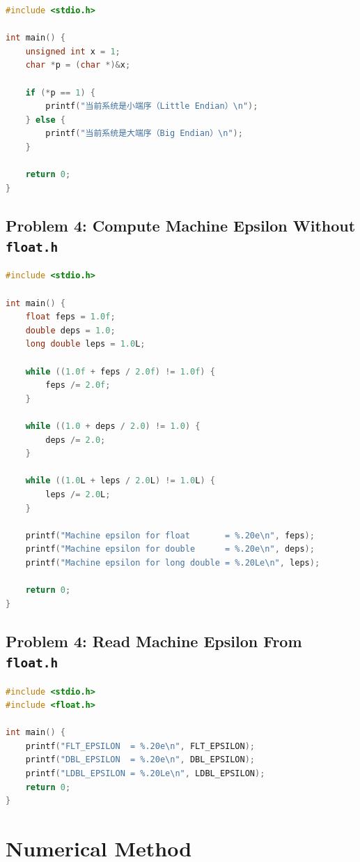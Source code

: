 \documentclass[12pt,a4paper]{article}
\begin{document}
\begin{lstlisting}[language=C]
#include <stdio.h>

int main() {
    unsigned int x = 1;
    char *p = (char *)&x;

    if (*p == 1) {
        printf("当前系统是小端序（Little Endian）\n");
    } else {
        printf("当前系统是大端序（Big Endian）\n");
    }

    return 0;
}
\end{lstlisting}

\subsection{Problem 4: Compute Machine Epsilon Without \texttt{float.h}}

\begin{lstlisting}[language=C]
#include <stdio.h>

int main() {
    float feps = 1.0f;
    double deps = 1.0;
    long double leps = 1.0L;

    while ((1.0f + feps / 2.0f) != 1.0f) {
        feps /= 2.0f;
    }

    while ((1.0 + deps / 2.0) != 1.0) {
        deps /= 2.0;
    }

    while ((1.0L + leps / 2.0L) != 1.0L) {
        leps /= 2.0L;
    }

    printf("Machine epsilon for float       = %.20e\n", feps);
    printf("Machine epsilon for double      = %.20e\n", deps);
    printf("Machine epsilon for long double = %.20Le\n", leps);

    return 0;
}
\end{lstlisting}

\subsection{Problem 4: Read Machine Epsilon From \texttt{float.h}}

\begin{lstlisting}[language=C]
#include <stdio.h>
#include <float.h>

int main() {
    printf("FLT_EPSILON  = %.20e\n", FLT_EPSILON);
    printf("DBL_EPSILON  = %.20e\n", DBL_EPSILON);
    printf("LDBL_EPSILON = %.20Le\n", LDBL_EPSILON);
    return 0;
}
\end{lstlisting}

\section{Numerical Method}
\end{document}
